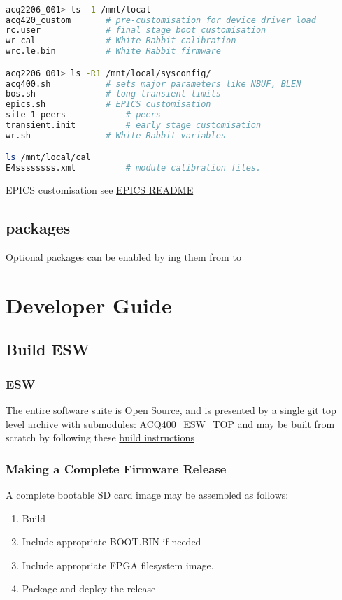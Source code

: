\documentclass[]{article}
\begin{document}
\begin{lstlisting}[language=bash,style=bashstyle,frame=single]

acq2206_001> ls -1 /mnt/local
acq420_custom       # pre-customisation for device driver load
rc.user             # final stage boot customisation
wr_cal              # White Rabbit calibration
wrc.le.bin          # White Rabbit firmware

acq2206_001> ls -R1 /mnt/local/sysconfig/
acq400.sh           # sets major parameters like NBUF, BLEN
bos.sh              # long transient limits
epics.sh            # EPICS customisation
site-1-peers            # peers
transient.init          # early stage customisation
wr.sh               # White Rabbit variables

ls /mnt/local/cal
E4ssssssss.xml			# module calibration files.
\end{lstlisting}
EPICS customisation see \href{https://github.com/D-TACQ/acq400ioc/blob/epics7/README}{EPICS README}

\subsection{packages}
Optional packages can be enabled by  ing them from  to 

\pagebreak
\section{Developer Guide}

\subsection{Build ESW}

\subsubsection{ESW}
The entire   software suite is Open Source, and is presented by a single git top level archive with submodules:
\href{https://github.com/D-TACQ/ACQ400_ESW_TOP.git}{ACQ400_ESW_TOP}
 and may be built from scratch by following these 
\href{https://github.com/D-TACQ/ACQ400_ESW_TOP/blob/main/README.md}{build instructions}


\subsubsection{Making a Complete Firmware Release}
A complete bootable SD card image may be assembled as follows:
\begin{enumerate}
	\item Build 
	\item Include appropriate BOOT.BIN if needed
	\item Include appropriate FPGA filesystem image.
	\item Package and deploy the release
\end{enumerate}
\end{document}
